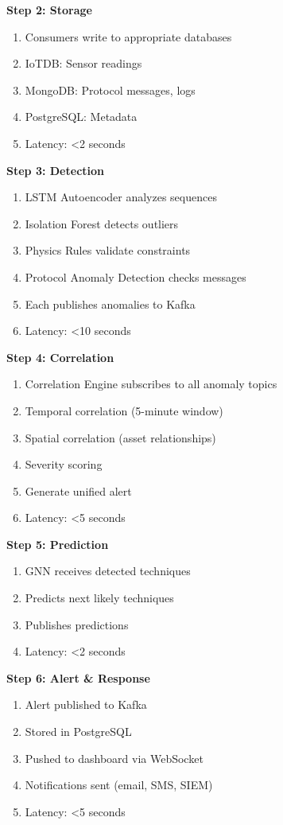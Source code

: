 \documentclass[12pt,a4paper]{article}
\begin{document}
\textbf{Step 2: Storage}
\begin{enumerate}[leftmargin=1cm,itemsep=0pt]
    \item Consumers write to appropriate databases
    \item IoTDB: Sensor readings
    \item MongoDB: Protocol messages, logs
    \item PostgreSQL: Metadata
    \item Latency: <2 seconds
\end{enumerate}

\textbf{Step 3: Detection}
\begin{enumerate}[leftmargin=1cm,itemsep=0pt]
    \item LSTM Autoencoder analyzes sequences
    \item Isolation Forest detects outliers
    \item Physics Rules validate constraints
    \item Protocol Anomaly Detection checks messages
    \item Each publishes anomalies to Kafka
    \item Latency: <10 seconds
\end{enumerate}

\textbf{Step 4: Correlation}
\begin{enumerate}[leftmargin=1cm,itemsep=0pt]
    \item Correlation Engine subscribes to all anomaly topics
    \item Temporal correlation (5-minute window)
    \item Spatial correlation (asset relationships)
    \item Severity scoring
    \item Generate unified alert
    \item Latency: <5 seconds
\end{enumerate}

\textbf{Step 5: Prediction}
\begin{enumerate}[leftmargin=1cm,itemsep=0pt]
    \item GNN receives detected techniques
    \item Predicts next likely techniques
    \item Publishes predictions
    \item Latency: <2 seconds
\end{enumerate}

\textbf{Step 6: Alert \& Response}
\begin{enumerate}[leftmargin=1cm,itemsep=0pt]
    \item Alert published to Kafka
    \item Stored in PostgreSQL
    \item Pushed to dashboard via WebSocket
    \item Notifications sent (email, SMS, SIEM)
    \item Latency: <5 seconds
\end{enumerate}
\end{document}
